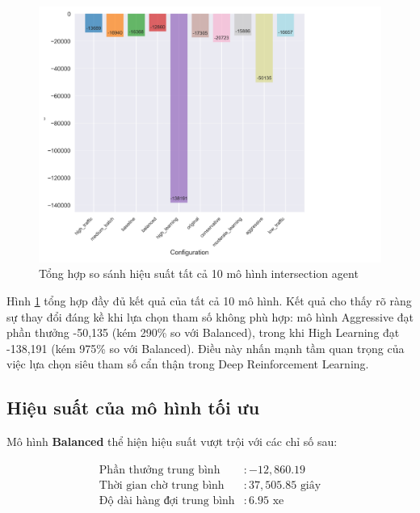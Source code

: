 \begin{figure}[!htp]
    \centering
    \includegraphics[width=\textwidth]{
        figures/individual_plots/intersection_full_performance_summary.png
    }
    \caption{Tổng hợp so sánh hiệu suất tất cả 10 mô hình intersection agent}
    \label{fig:intersection_full_performance_summary}
\end{figure}

Hình \ref{fig:intersection_full_performance_summary} tổng hợp đầy đủ kết quả của
tất cả 10 mô hình. Kết quả cho thấy rõ ràng sự thay đổi đáng kề khi lựa chọn
tham số không phù hợp: mô hình Aggressive đạt phần thưởng -50,135 (kém 290\% so với
Balanced), trong khi High Learning đạt -138,191 (kém 975\% so với Balanced).
Điều này nhấn mạnh tầm quan trọng của việc lựa chọn siêu tham số cẩn thận
trong Deep Reinforcement Learning.

\subsection{Hiệu suất của mô hình tối ưu}

Mô hình \textbf{Balanced} thể hiện hiệu suất vượt trội với các chỉ số sau:

\begin{align}
    \text{Phần thưởng trung bình}     & : -12,860.19             \\
    \text{Thời gian chờ trung bình}   & : 37,505.85 \text{ giây} \\
    \text{Độ dài hàng đợi trung bình} & : 6.95 \text{ xe}
\end{align}

